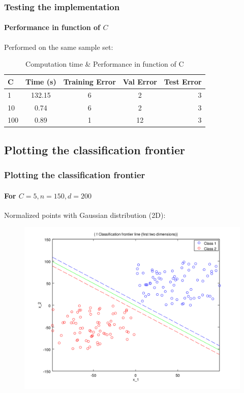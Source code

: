 \documentclass{beamer}
\begin{document}
\begin{frame}
\frametitle{Testing the implementation}
\framesubtitle{Performance in function of $C$}

Performed on the same sample set:\\

                \begin{table}
                \centering
                \caption{Computation time \& Performance in function of C}
                \begin{tabular}{| l | c | c | c | r |}
                \hline
               C  & Time (s) & Training Error & Val Error & Test Error\\ \hline
               1 & 132.15 & 6 & 2 & 3\\ \hline
               10  & 0.74 & 6 & 2 & 3\\ \hline
               100  & 0.89 & 1 & 12 & 3\\ \hline
                \end{tabular}
                \end{table}

\end{frame}

\subsection{Plotting the classification frontier}

\begin{frame}
\tableofcontents[currentsubsection]
\end{frame}

\begin{frame}
\frametitle{Plotting the \textbf{classification frontier}}
\framesubtitle{For $C = 5, n = 150, d = 200$}

Normalized points with Gaussian distribution (2D):

         \begin{figure}
         \centering
         \includegraphics[scale=0.4]{images/line4.png}
         \end{figure}

\end{frame}
\end{document}
